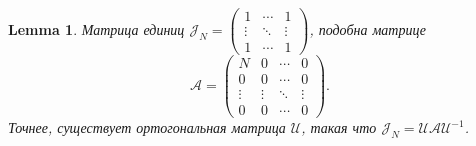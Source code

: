 \documentclass[14pt,a4paper]{extarticle}
\newtheorem{lem}{Lemma}
\theoremstyle{definition}
\begin{document}
\begin{lem}
    Матрица единиц 
    \( \mathcal{J}_N =
    \begin{pmatrix}
        1 & \cdots & 1 \\
        \vdots & \ddots & \vdots \\ 
    1 & \cdots & 1 \end{pmatrix} \),
    подобна матрице
    \[
        \mathcal{A} = \begin{pmatrix}
            N & 0 & \cdots & 0 \\
            0 & 0 & \cdots & 0 \\
            \vdots & \vdots & \ddots & \vdots \\
            0 & 0 & \cdots & 0 \end{pmatrix}. \]
    Точнее, существует ортогональная матрица \( \mathcal{U} \),
    такая что
    \( \mathcal{J}_N = \mathcal{U}\mathcal{A} \mathcal{U}^{-1} \).
\end{lem}
\end{document}

